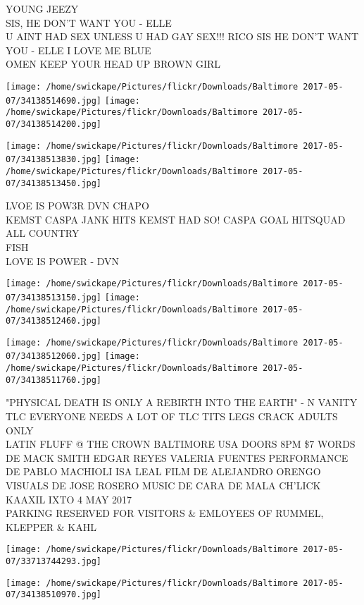 \documentclass[10pt,letterpaper]{article}
\begin{document}
YOUNG JEEZY\\
SIS, HE DON'T WANT YOU {-} ELLE\\
U AINT HAD SEX UNLESS U HAD GAY SEX!!! RICO SIS HE DON'T WANT YOU {-} ELLE I LOVE ME BLUE\\
OMEN KEEP YOUR HEAD UP BROWN GIRL
\pagebreak

\texttt{[image: /home/swickape/Pictures/flickr/Downloads/Baltimore 2017-05-07/34138514690.jpg]}
\texttt{[image: /home/swickape/Pictures/flickr/Downloads/Baltimore 2017-05-07/34138514200.jpg]}

\texttt{[image: /home/swickape/Pictures/flickr/Downloads/Baltimore 2017-05-07/34138513830.jpg]}
\texttt{[image: /home/swickape/Pictures/flickr/Downloads/Baltimore 2017-05-07/34138513450.jpg]}

LVOE IS POW3R DVN CHAPO\\
KEMST CASPA JANK HITS KEMST HAD SO! CASPA GOAL HITSQUAD ALL COUNTRY\\
FISH\\
LOVE IS POWER {-} DVN
\pagebreak

\texttt{[image: /home/swickape/Pictures/flickr/Downloads/Baltimore 2017-05-07/34138513150.jpg]}
\texttt{[image: /home/swickape/Pictures/flickr/Downloads/Baltimore 2017-05-07/34138512460.jpg]}

\texttt{[image: /home/swickape/Pictures/flickr/Downloads/Baltimore 2017-05-07/34138512060.jpg]}
\texttt{[image: /home/swickape/Pictures/flickr/Downloads/Baltimore 2017-05-07/34138511760.jpg]}

"PHYSICAL DEATH IS ONLY A REBIRTH INTO THE EARTH" {-} N VANITY\\
TLC EVERYONE NEEDS A LOT OF TLC TITS LEGS CRACK ADULTS ONLY\\
LATIN FLUFF @ THE CROWN BALTIMORE USA DOORS 8PM \$7 WORDS DE MACK SMITH EDGAR REYES VALERIA FUENTES PERFORMANCE DE PABLO MACHIOLI ISA LEAL FILM DE ALEJANDRO ORENGO VISUALS DE JOSE ROSERO MUSIC DE CARA DE MALA CH'LICK KAAXIL IXTO 4 MAY 2017\\
PARKING RESERVED FOR VISITORS \& EMLOYEES OF RUMMEL, KLEPPER \& KAHL
\pagebreak

\texttt{[image: /home/swickape/Pictures/flickr/Downloads/Baltimore 2017-05-07/33713744293.jpg]}

\vspace{0.25in}
\texttt{[image: /home/swickape/Pictures/flickr/Downloads/Baltimore 2017-05-07/34138510970.jpg]}
\end{document}
